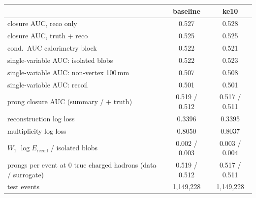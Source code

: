 \begin{tabular}{lcc}
\toprule
 & baseline & ke10 \\
\midrule
closure AUC, reco only & 0.527 & 0.528 \\
closure AUC, truth + reco & 0.525 & 0.525 \\
cond.\ AUC calorimetry block & 0.522 & 0.521 \\
single-variable AUC: isolated blobs & 0.522 & 0.523 \\
single-variable AUC: non-vertex 100\,mm & 0.507 & 0.508 \\
single-variable AUC: recoil & 0.501 & 0.501 \\
prong closure AUC (summary / + truth) & 0.519 / 0.512 & 0.517 / 0.511 \\
reconstruction log loss & 0.3396 & 0.3395 \\
multiplicity log loss & 0.8050 & 0.8037 \\
$W_1$ $\log E_\mathrm{recoil}$ / isolated blobs & 0.002 / 0.003 & 0.003 / 0.004 \\
prongs per event at 0 true charged hadrons (data / surrogate) & 0.519 / 0.512 & 0.517 / 0.511 \\
test events & 1,149,228 & 1,149,228 \\
\bottomrule
\end{tabular}
